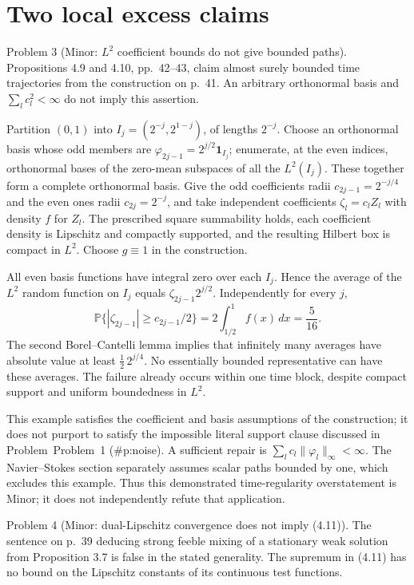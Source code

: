 \documentclass[10pt]{article}
\begin{document}
\section*{Two local excess claims}
Problem 3 (Minor: \(L^2\) coefficient bounds do not give bounded paths).  Propositions 4.9 and 4.10, pp. 42–43, claim almost surely bounded time trajectories from the construction on p. 41. An arbitrary orthonormal basis and \(\sum_l c_l^2<\infty\) do not imply this assertion.\par
Partition \((0,1)\) into \(I_j=(2^{-j},2^{1-j})\), of lengths \(2^{-j}\). Choose an orthonormal basis whose odd members are \(\varphi_{2j-1}=2^{j/2}\mathbf1_{I_j}\); enumerate, at the even indices, orthonormal bases of the zero-mean subspaces of all the \(L^2(I_j)\). These together form a complete orthonormal basis. Give the odd coefficients radii \(c_{2j-1}=2^{-j/4}\) and the even ones radii \(c_{2j}=2^{-j}\), and take independent coefficients \(\zeta_l=c_lZ_l\) with density \(f\) for \(Z_l\). The prescribed square summability holds, each coefficient density is Lipschitz and compactly supported, and the resulting Hilbert box is compact in \(L^2\). Choose \(g\equiv1\) in the construction.\par
All even basis functions have integral zero over each \(I_j\). Hence the average of the \(L^2\) random function on \(I_j\) equals \(\zeta_{2j-1}2^{j/2}\). Independently for every \(j\), \[\mathbb P\{|\zeta_{2j-1}|\geq c_{2j-1}/2\}
 =2\int_{1/2}^1f(x)\,dx=\frac5{16}.\] The second Borel–Cantelli lemma implies that infinitely many averages have absolute value at least \(\tfrac12\,2^{j/4}\). No essentially bounded representative can have these averages. The failure already occurs within one time block, despite compact support and uniform boundedness in \(L^2\).\par
This example satisfies the coefficient and basis assumptions of the construction; it does not purport to satisfy the impossible literal support clause discussed in Problem Problem 1 (\#p:noise). A sufficient repair is \(\sum_l c_l\|\varphi_l\|_\infty<\infty\). The Navier–Stokes section separately assumes scalar paths bounded by one, which excludes this example. Thus this demonstrated time-regularity overstatement is Minor; it does not independently refute that application.\par
Problem 4 (Minor: dual-Lipschitz convergence does not imply (4.11)).  The sentence on p. 39 deducing strong feeble mixing of a stationary weak solution from Proposition 3.7 is false in the stated generality. The supremum in (4.11) has no bound on the Lipschitz constants of its continuous test functions.\par
\end{document}
